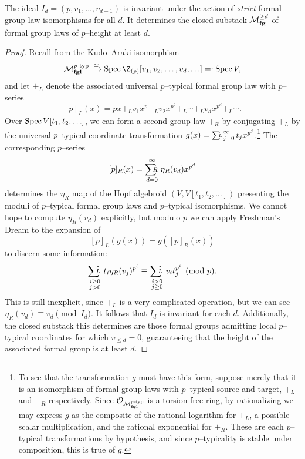 \begin{corollary}\label{IdIsAnInvariantIdeal}
The ideal \(I_d = (p, v_1, \ldots, v_{d-1})\) is invariant under the action of \emph{strict} formal group law isomorphisms for all \(d\).  It determines the closed substack \(\mathcal{M}_{\mathbf{fg}}^{\ge d}\) of formal group laws of \(p\)--height at least \(d\).
\end{corollary}
\begin{proof}
Recall from  the Kudo--Araki isomorphism \[\moduli{fgl}^{\ptyp} \xrightarrow{\simeq} \Spec \Z_{(p)}[v_1, v_2, \ldots, v_d, \ldots] =: \Spec V,\] and let \(+_L\) denote the associated universal \(p\)--typical formal group law with \(p\)--series \[[p]_L(x) = px +_L v_1 x^p +_L v_2 x^{p^2} +_L \cdots +_L v_d x^{p^d} +_L \cdots.\]  Over \(\operatorname{Spec} V[t_1, t_2, \ldots]\), we can form a second group law \(+_R\) by conjugating \(+_L\) by the universal \(p\)--typical coordinate transformation \(g(x) = \sumfgl{L}_{j=0}^\infty t_j x^{p^j}\).\footnote{To see that the transformation \(g\) must have this form, suppose merely that it is an isomorphism of formal group laws with \(p\)--typical source and target, \(+_L\) and \(+_R\) respectively.  Since \(\mathcal{O}_{\mathcal{M}_{\mathbf{fgl}}^{\mathit{p}\text{-}\mathrm{typ}}}\) is a torsion-free ring, by rationalizing we may express \(g\) as the composite of the rational logarithm for \(+_L\), a possible scalar multiplication, and the rational exponential for \(+_R\).  These are each \(p\)--typical transformations by hypothesis, and since \(p\)--typicality is stable under composition, this is true of \(g\).}  The corresponding \(p\)--series \[[p]_R(x) = \sumfgl{R}_{d=0}^\infty \eta_R(v_d) x^{p^d}\] determines the \(\eta_R\) map of the Hopf algebroid \((V, V[t_1, t_2, \ldots])\) presenting the moduli of \(p\)--typical formal group laws and \(p\)--typical isomorphisms.  We cannot hope to compute \(\eta_R(v_d)\) explicitly, but modulo \(p\) we can apply Freshman's Dream to the expansion of \[[p]_L(g(x)) = g([p]_R(x))\] to discern some information: \[\sumfgl{L}_{\substack{i \ge 0 \\ j > 0}} t_i \eta_R(v_j)^{p^i} \equiv \sumfgl{L}_{\substack{i > 0 \\ j \ge 0}} v_i t_j^{p^i} \pmod p.\]  This is still inexplicit, since \(+_L\) is a very complicated operation, but we can see \(\eta_R(v_d) \equiv v_d \pmod{I_d}\).  It follows that \(I_d\) is invariant for each \(d\).  Additionally, the closed substack this determines are those formal groups admitting local \(p\)--typical coordinates for which \(v_{\le d} = 0\), guaranteeing that the height of the associated formal group is at least \(d\).
\end{proof}


